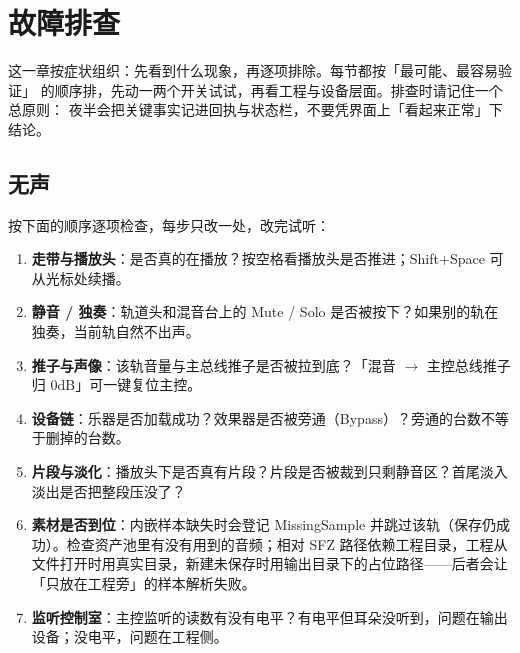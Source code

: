 
\chapter{故障排查}
\label{ch:troubleshooting}






这一章按症状组织：先看到什么现象，再逐项排除。每节都按「最可能、最容易验证」
的顺序排，先动一两个开关试试，再看工程与设备层面。排查时请记住一个总原则：
夜半会把关键事实记进回执与状态栏，不要凭界面上「看起来正常」下结论。

\section{无声}

按下面的顺序逐项检查，每步只改一处，改完试听：

\begin{enumerate}
  \item \textbf{走带与播放头}：是否真的在播放？按空格看播放头是否推进；Shift+Space 可从光标处续播。
  \item \textbf{静音 / 独奏}：轨道头和混音台上的 Mute / Solo 是否被按下？如果别的轨在独奏，当前轨自然不出声。
  \item \textbf{推子与声像}：该轨音量与主总线推子是否被拉到底？「混音 $\to$ 主控总线推子归 0dB」可一键复位主控。
  \item \textbf{设备链}：乐器是否加载成功？效果器是否被旁通（Bypass）？旁通的台数不等于删掉的台数。
  \item \textbf{片段与淡化}：播放头下是否真有片段？片段是否被裁到只剩静音区？首尾淡入淡出是否把整段压没了？
  \item \textbf{素材是否到位}：内嵌样本缺失时会登记 MissingSample 并跳过该轨（保存仍成功）。检查资产池里有没有用到的音频；相对 SFZ 路径依赖工程目录，工程从文件打开时用真实目录，新建未保存时用输出目录下的占位路径——后者会让「只放在工程旁」的样本解析失败。
  \item \textbf{监听控制室}：主控监听的读数有没有电平？有电平但耳朵没听到，问题在输出设备；没电平，问题在工程侧。
\end{enumerate}

